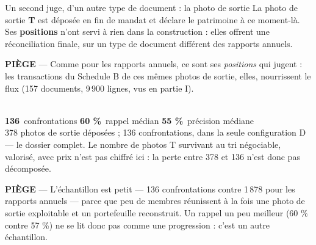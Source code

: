 \documentclass[11pt,aspectratio=169]{beamer}
\newcommand{\kpi}[3]{{\large\textbf{\textcolor{#1}{#2}}}~{\footnotesize #3}}
\newcommand{\defl}[1]{{\scriptsize\color{black!55}#1}}
\newcommand{\piege}[1]{%
  \colorbox{warnorange!12}{\parbox{\dimexpr\linewidth-8pt}{\scriptsize
    \textbf{\textcolor{warnorange}{PIÈGE}}\; --- #1}}}
\begin{document}
\begin{frame}{Un second juge, d'un autre type de document : la photo de sortie}
  \small
  La photo de sortie \textbf{T} est déposée en fin de mandat et déclare le patrimoine à ce
  moment-là. Ses \textbf{positions} n'ont servi à rien dans la construction : elles offrent une
  réconciliation finale, sur un type de document différent des rapports annuels.\\[3mm]
  \piege{Comme pour les rapports annuels, ce sont ses \emph{positions} qui jugent : les
  transactions du Schedule B de ces mêmes photos de sortie, elles, nourrissent le flux (157
  documents, 9\,900 lignes, vus en partie I).}\\[4mm]
  \centering
  \kpi{helec}{136}{confrontations} \quad
  \kpi{okgreen}{60 \%}{rappel médian} \quad
  \kpi{okgreen}{55 \%}{précision médiane}\\[2mm]
  \defl{378 photos de sortie déposées ; 136 confrontations, dans la seule configuration D --- le
  dossier complet. Le nombre de photos T survivant au tri \og{}négociable, valorisé, avec prix\fg{}
  n'est pas chiffré ici : la perte entre 378 et 136 n'est donc pas décomposée.}\\[4mm]
  \raggedright
  \piege{L'échantillon est petit --- 136 confrontations contre 1\,878 pour les rapports annuels ---
  parce que peu de membres réunissent à la fois une photo de sortie exploitable et un portefeuille
  reconstruit. Un rappel un peu meilleur (60 \% contre 57 \%) ne se lit donc pas comme une
  progression : c'est un autre échantillon.}
\end{frame}
\end{document}
